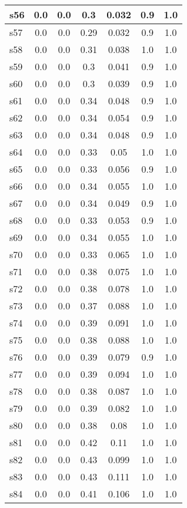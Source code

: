 \documentclass{article}
\begin{document}
\begin{tabular}{|l|c|c|c|c|c|c|}
\hline
s56 &0.0 & 0.0 & 0.3 & 0.032 & 0.9 & 1.0\\
\hline
s57 &0.0 & 0.0 & 0.29 & 0.032 & 0.9 & 1.0\\
\hline
s58 &0.0 & 0.0 & 0.31 & 0.038 & 1.0 & 1.0\\
\hline
s59 &0.0 & 0.0 & 0.3 & 0.041 & 0.9 & 1.0\\
\hline
s60 &0.0 & 0.0 & 0.3 & 0.039 & 0.9 & 1.0\\
\hline
s61 &0.0 & 0.0 & 0.34 & 0.048 & 0.9 & 1.0\\
\hline
s62 &0.0 & 0.0 & 0.34 & 0.054 & 0.9 & 1.0\\
\hline
s63 &0.0 & 0.0 & 0.34 & 0.048 & 0.9 & 1.0\\
\hline
s64 &0.0 & 0.0 & 0.33 & 0.05 & 1.0 & 1.0\\
\hline
s65 &0.0 & 0.0 & 0.33 & 0.056 & 0.9 & 1.0\\
\hline
s66 &0.0 & 0.0 & 0.34 & 0.055 & 1.0 & 1.0\\
\hline
s67 &0.0 & 0.0 & 0.34 & 0.049 & 0.9 & 1.0\\
\hline
s68 &0.0 & 0.0 & 0.33 & 0.053 & 0.9 & 1.0\\
\hline
s69 &0.0 & 0.0 & 0.34 & 0.055 & 1.0 & 1.0\\
\hline
s70 &0.0 & 0.0 & 0.33 & 0.065 & 1.0 & 1.0\\
\hline
s71 &0.0 & 0.0 & 0.38 & 0.075 & 1.0 & 1.0\\
\hline
s72 &0.0 & 0.0 & 0.38 & 0.078 & 1.0 & 1.0\\
\hline
s73 &0.0 & 0.0 & 0.37 & 0.088 & 1.0 & 1.0\\
\hline
s74 &0.0 & 0.0 & 0.39 & 0.091 & 1.0 & 1.0\\
\hline
s75 &0.0 & 0.0 & 0.38 & 0.088 & 1.0 & 1.0\\
\hline
s76 &0.0 & 0.0 & 0.39 & 0.079 & 0.9 & 1.0\\
\hline
s77 &0.0 & 0.0 & 0.39 & 0.094 & 1.0 & 1.0\\
\hline
s78 &0.0 & 0.0 & 0.38 & 0.087 & 1.0 & 1.0\\
\hline
s79 &0.0 & 0.0 & 0.39 & 0.082 & 1.0 & 1.0\\
\hline
s80 &0.0 & 0.0 & 0.38 & 0.08 & 1.0 & 1.0\\
\hline
s81 &0.0 & 0.0 & 0.42 & 0.11 & 1.0 & 1.0\\
\hline
s82 &0.0 & 0.0 & 0.43 & 0.099 & 1.0 & 1.0\\
\hline
s83 &0.0 & 0.0 & 0.43 & 0.111 & 1.0 & 1.0\\
\hline
s84 &0.0 & 0.0 & 0.41 & 0.106 & 1.0 & 1.0\\

\end{tabular}
\end{document}
